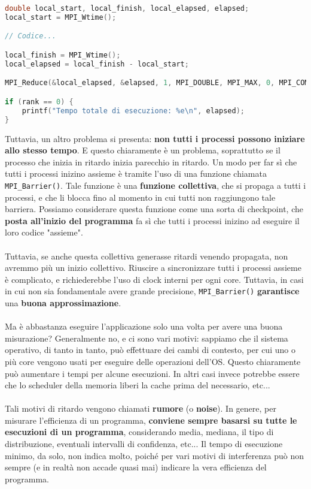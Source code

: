 \begin{codeblock}
    \begin{lstlisting}[language = C, numbers = none, columns=fullflexible]
double local_start, local_finish, local_elapsed, elapsed;
local_start = MPI_Wtime();

// Codice...

local_finish = MPI_Wtime();
local_elapsed = local_finish - local_start;

MPI_Reduce(&local_elapsed, &elapsed, 1, MPI_DOUBLE, MPI_MAX, 0, MPI_COMM_WORLD);

if (rank == 0) {
    printf("Tempo totale di esecuzione: %e\n", elapsed);
}\end{lstlisting}
\end{codeblock}

Tuttavia, un altro problema si presenta: \textbf{non tutti i processi possono iniziare allo stesso tempo}. E questo chiaramente è un problema, soprattutto se il processo che inizia in ritardo inizia parecchio in ritardo. Un modo per far sì che tutti i processi inizino assieme è tramite l'uso di una funzione chiamata \verb|MPI_Barrier()|. Tale funzione è una \textbf{funzione collettiva}, che si propaga a tutti i processi, e che li blocca fino al momento in cui tutti non raggiungono tale barriera. Possiamo considerare questa funzione come una sorta di checkpoint, che \textbf{posta all'inizio del programma} fa sì che tutti i processi inizino ad eseguire il loro codice "assieme".
\\\\
Tuttavia, se anche questa collettiva generasse ritardi venendo propagata, non avremmo più un inizio collettivo. Riuscire a sincronizzare tutti i processi assieme è complicato, e richiederebbe l'uso di clock interni per ogni core. Tuttavia, in casi in cui non sia fondamentale avere grande precisione, \verb|MPI_Barrier()| \textbf{garantisce} una \textbf{buona approssimazione}.
\\\\
Ma è abbastanza eseguire l'applicazione solo una volta per avere una buona misurazione? Generalmente no, e ci sono vari motivi: sappiamo che il sistema operativo, di tanto in tanto, può effettuare dei cambi di contesto, per cui uno o più core vengono usati per eseguire delle operazioni dell'OS. Questo chiaramente può aumentare i tempi per alcune esecuzioni. In altri casi invece potrebbe essere che lo scheduler della memoria liberi la cache prima del necessario, etc...
\\\\
Tali motivi di ritardo vengono chiamati \textbf{rumore} (o \textbf{noise}). In genere, per misurare l'efficienza di un programma, \textbf{conviene sempre basarsi su tutte le esecuzioni di un programma}, considerando media, mediana, il tipo di distribuzione, eventuali intervalli di confidenza, etc... Il tempo di esecuzione minimo, da solo, non indica molto, poiché per vari motivi di interferenza può non sempre (e in realtà non accade quasi mai) indicare la vera efficienza del programma.

